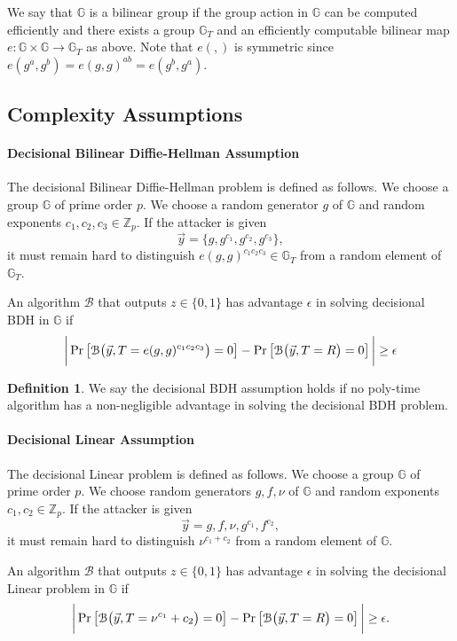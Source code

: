 \documentclass[a4paper, 11pt]{article}
\newtheorem{definition}[theorem]{Definition}
\newcommand{\Z}{\ensuremath{\mathbb{Z}}}
\newcommand{\G}{\ensuremath{\mathbb{G}}}
\theoremstyle{definition}
\newtheorem{definition}[theorem]{Definition}
\newcommand{\weil}{\ensuremath{e}}
\newcommand{\e}{\epsilon}
\newcommand{\AlgB}{\ensuremath{{\cal B}}}
\begin{document}
We say that $\G$ is a bilinear group if the group
action in $\G$ can be computed efficiently
and there exists a group $\G_T$ and an efficiently computable
bilinear map $\weil:\G \times \G \to \G_T$ as above.
Note that $\weil(,)$ is symmetric since
$\weil(g^a,g^b) = \weil(g,g)^{ab} = \weil(g^b,g^a)$.


\subsection{Complexity Assumptions}
\label{sec:complexity}
\paragraph{Decisional Bilinear Diffie-Hellman Assumption} The decisional Bilinear Diffie-Hellman problem is defined as follows. We choose a group $\G$ of prime order $p$. We choose a random generator $g$ of $\G$ and random exponents $c_1, c_2, c_3 \in \Z_p$. If the attacker is given
\[\vec{y} = \{g, g^{c_1}, g^{c_2}, g^{c_3}\},\]
it must remain hard to distinguish $e(g,g)^{c_1c_2c_3} \in \G_{T}$ from a random element of $\G_{T}$.

An algorithm $\mathcal{B}$ that outputs $z \in \{0,1\}$ has advantage $\epsilon$ in solving decisional BDH in $\G$ if
\begin{eqnarray*}
\bigg| \Pr\left[   \AlgB\big(\vec{y},
                                    T=e(g,g)^{c_1c_2c_3}\big) = 0 \right] -
       \Pr\left[   \AlgB\big(\vec{y},
                                    T=R \big) = 0 \right] \bigg| \geq \e
\end{eqnarray*}

\begin{definition} We say the decisional BDH assumption holds if no poly-time algorithm has a non-negligible advantage in solving the decisional BDH problem.
\end{definition}

\paragraph{Decisional Linear Assumption}
The decisional Linear problem is defined as follows. We choose a group $\G$ of prime order $p$. We choose random generators $g, f, \nu$ of $\G$ and random exponents $c_1, c_2 \in \Z_p$. If the attacker is given
\[\vec{y} = g, f, \nu, g^{c_1}, f^{c_2},\]
it must remain hard to distinguish $\nu^{c_1+c_2}$ from a random element of $\G$.

An algorithm $\mathcal{B}$ that outputs $z\in \{0,1\}$ has advantage $\epsilon$ in solving the decisional Linear problem in $\G$ if
\begin{eqnarray*}
\bigg| \Pr\left[   \AlgB\big(\vec{y},
                                    T=\nu^{c_1}+c_2\big) = 0 \right] -
       \Pr\left[   \AlgB\big(\vec{y},
                                    T=R \big) = 0 \right] \bigg| \geq \e.
\end{eqnarray*}
\end{document}
